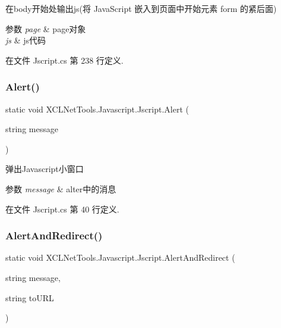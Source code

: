 在body开始处输出js(将 Java\+Script 嵌入到页面中开始元素 form 的紧后面) 


\begin{DoxyParams}{参数}
{\em page} & page对象\\
\hline
{\em js} & js代码\\
\hline
\end{DoxyParams}


在文件 Jscript.\+cs 第 238 行定义.

\mbox{\label{class_x_c_l_net_tools_1_1_javascript_1_1_jscript_a8bb91a5a3ddf09a39443e7983f2e8ee2}} 
\subsubsection{\texorpdfstring{Alert()}{Alert()}}
{\footnotesize\ttfamily static void X\+C\+L\+Net\+Tools.\+Javascript.\+Jscript.\+Alert (\begin{DoxyParamCaption}\item[{string}]{message }\end{DoxyParamCaption})\hspace{0.3cm}{\ttfamily [static]}}



弹出\+Javascript小窗口 


\begin{DoxyParams}{参数}
{\em message} & alter中的消息\\
\hline
\end{DoxyParams}


在文件 Jscript.\+cs 第 40 行定义.

\mbox{\label{class_x_c_l_net_tools_1_1_javascript_1_1_jscript_a31b283197fe1f60b11830bea87352b95}} 
\subsubsection{\texorpdfstring{Alert\+And\+Redirect()}{AlertAndRedirect()}}
{\footnotesize\ttfamily static void X\+C\+L\+Net\+Tools.\+Javascript.\+Jscript.\+Alert\+And\+Redirect (\begin{DoxyParamCaption}\item[{string}]{message,  }\item[{string}]{to\+U\+RL }\end{DoxyParamCaption})\hspace{0.3cm}{\ttfamily [static]}}



